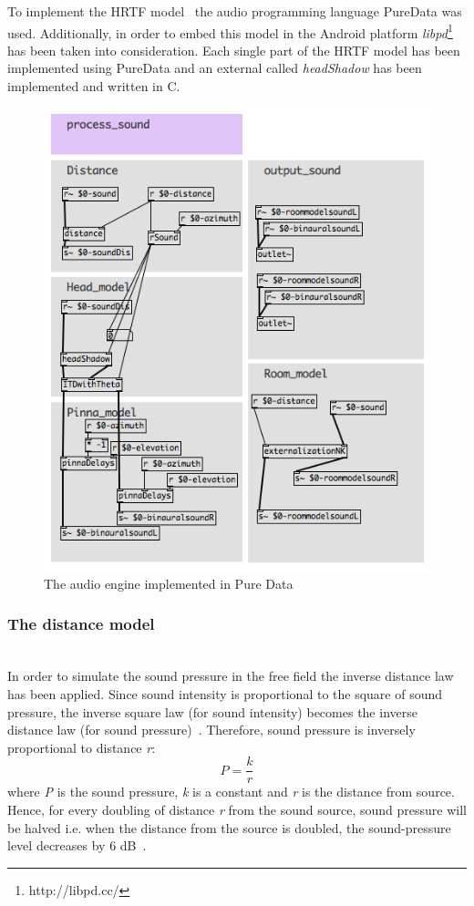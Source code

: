 \documentclass[journal]{IEEEtran}
\begin{document}
To implement the HRTF model~\cite{Brown1997} the audio programming language PureData was used. Additionally, in order to embed this model in the Android platform \textit{libpd}\footnote{http://libpd.cc/} has been taken into consideration. Each single part of the HRTF model has been implemented using PureData and an       external called \textit{headShadow} has been implemented and written in C. 

\begin{figure}[h!]
  \centering
    \includegraphics[scale=0.5]{graphics/audioengine.png}
  \caption{The audio engine implemented in Pure Data}
  \label{fig:augioengine}
\end{figure}



\subsubsection{The distance model}~\\
In order to simulate the sound pressure in the free field the inverse distance law has been applied. Since sound intensity is proportional to the square of sound pressure, the inverse square law (for sound intensity) becomes the inverse distance law (for sound pressure)~\cite{everest2009master}. Therefore, sound pressure is inversely proportional to distance \textit{r}:
\begin{equation}\label{eq:soundpressure}
P = \frac{k}{r}
\end{equation}
where \textit{P} is the sound pressure, \textit{k} is a constant and \textit{r} is the distance from source.
Hence, for every doubling of distance \textit{r} from the sound source, sound pressure will be halved i.e. when the distance from the source is doubled, the sound-pressure level decreases by 6 dB~\cite{everest2009master}.
\end{document}

